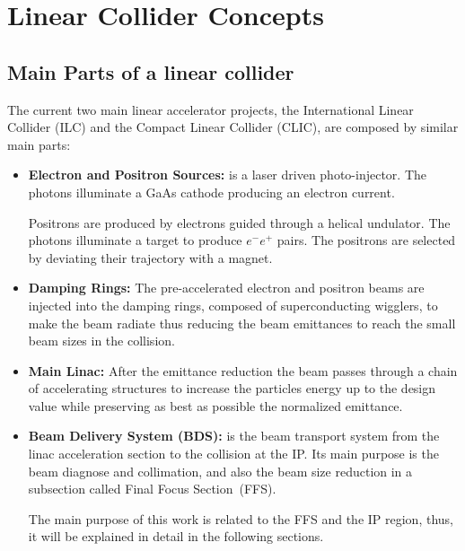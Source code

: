 \chapter{Linear Collider Concepts}
\section{Main Parts of a linear collider}
The current two main linear accelerator projects, the International Linear Collider (ILC)\cite{ILCdes} and the Compact Linear Collider (CLIC)\cite{CLICdes}, are composed by similar main parts:\par
\begin{itemize}
 \item \textbf{Electron and Positron Sources:} is a laser driven photo-injector. The photons illuminate a GaAs cathode producing an electron current.\par
 Positrons are produced by electrons guided through a helical undulator. The photons illuminate a target to produce $e^-e^+$ pairs. The positrons are selected by deviating their trajectory with a magnet.\par
 \item \textbf{Damping Rings:} The pre-accelerated electron and positron beams are injected into the damping rings, composed of superconducting wigglers,  to make the beam radiate thus reducing the beam emittances to reach the small beam sizes in the collision.
 \item \textbf{Main Linac:} After the emittance reduction the beam passes through a chain of accelerating structures to increase the particles energy up to the design value while preserving as best as possible the normalized emittance.
 \item \textbf{Beam Delivery System (BDS):} is the beam transport system from the linac acceleration section to the collision at the IP. Its main purpose is the beam diagnose and collimation, and also the beam size reduction in a subsection called Final Focus Section~(FFS).\par
 The main purpose of this work is related to the FFS and the IP region, thus, it will be explained in detail in the following sections.\par
\end{itemize} 
